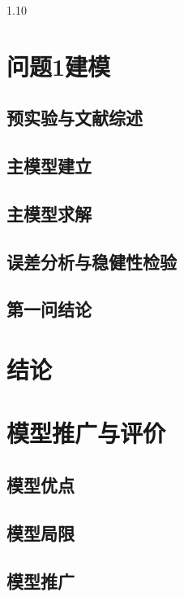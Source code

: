 \documentclass[12pt,a4paper]{ctexrep}
\numberwithin{equation}{section}
\begin{document}
\begin{spacing}{1.10}
{		%
			\section{问题1建模}
			\subsection{预实验与文献综述}
			\subsection{主模型建立}
			\subsection{主模型求解}
			\subsection{误差分析与稳健性检验}
			\subsection{第一问结论}
			
			\section{结论}
		
			\section{模型推广与评价}
			\subsection{模型优点}
			\subsection{模型局限}
			\subsection{模型推广}
		}
	\end{spacing}
	
\end{document}
